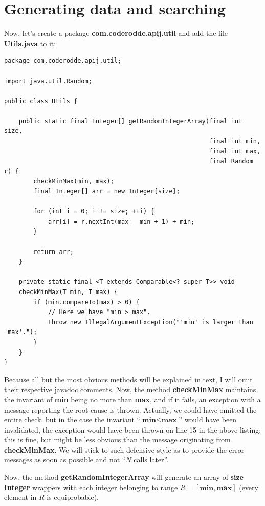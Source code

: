 \documentclass[oneside]{book}
\begin{document}
\section{Generating data and searching}
Now, let's create a package \textbf{com.coderodde.apij.util} and add the file \textbf{Utils.java} to it:
\begin{lstlisting}
package com.coderodde.apij.util;

import java.util.Random;

public class Utils {
    
    public static final Integer[] getRandomIntegerArray(final int size,
                                                        final int min,
                                                        final int max,
                                                        final Random r) {
        checkMinMax(min, max);
        final Integer[] arr = new Integer[size];
        
        for (int i = 0; i != size; ++i) {
            arr[i] = r.nextInt(max - min + 1) + min;
        }
        
        return arr;
    }
    
    private static final <T extends Comparable<? super T>> void 
    checkMinMax(T min, T max) {
        if (min.compareTo(max) > 0) {
            // Here we have "min > max".
            throw new IllegalArgumentException("'min' is larger than 'max'.");
        }
    }
}
\end{lstlisting}
Because all but the most obvious methods will be explained in text, I will omit their respective javadoc comments. Now, the method \textbf{checkMinMax} maintains the invariant of \textbf{min} being no more than \textbf{max}, and if it fails, an exception with a message reporting the root cause is thrown. Actually, we could have omitted the entire check, but in the case the invariant ``$\textbf{min} \leq \textbf{max}$'' would have been invalidated, the exception would have been thrown on line 15 in the above listing; this is fine, but might be less obvious than the message originating from \textbf{checkMinMax}. We will stick to such defensive style as to provide the error messages as soon as possible and not ``$N$ calls later''.

Now, the method \textbf{getRandomIntegerArray} will generate an array of \textbf{size} \textbf{Integer} wrappers with each integer belonging to range $R = [\textbf{min}, \textbf{max}]$ (every element in $R$ is equiprobable).
\end{document}
